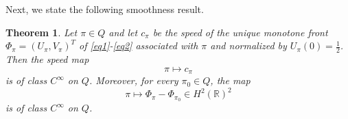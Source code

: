 \documentclass[11pt]{article}
\numberwithin{equation}{section}
\newcommand{\1}{\mathbbm{1}}
\numberwithin{equation}{section}
\newtheorem{theorem}{Theorem}[section]
\theoremstyle{definition}
\def \R {\mathbb{R}}
\numberwithin{equation}{section}
\begin{document}
Next, we state the following smoothness result. 

\begin{theorem}\label{theosmooth}
	Let $\pi \in Q$ and let $c_{\pi}$ be the speed of the unique monotone front
	$\Phi_{\pi}=(U_{\pi},V_{\pi})^T$ of \eqref{eq1}-\eqref{eq2} associated with
	$\pi$ and normalized by $U_{\pi}(0)=\frac{1}{2}$. Then the speed map
	\begin{equation*}
	\pi \longmapsto c_{\pi}
	\end{equation*}
	is of class $C^\infty$ on $Q$. Moreover, for every
	$\pi_0\in Q$, the map
	\begin{equation*}
		\pi\longmapsto
		\Phi_{\pi}-\Phi_{\pi_0}\in H^2(\R)^2
	\end{equation*}
	is of class $C^\infty$ on $Q$. 
\end{theorem}
\end{document}
